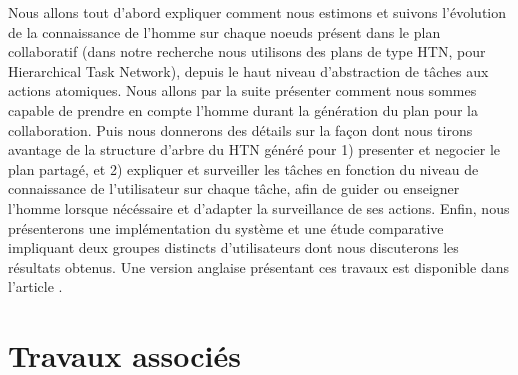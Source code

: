 \documentclass[a4paper,11pt,twoside]{StyleThese}
\begin{document}
Nous allons tout d'abord expliquer comment nous estimons et suivons l'évolution de la connaissance de l'homme sur chaque noeuds présent dans le plan collaboratif (dans notre recherche nous utilisons des plans de type HTN, pour Hierarchical Task Network), depuis le haut niveau d'abstraction de tâches aux actions atomiques. Nous allons par la suite présenter comment nous sommes capable de prendre en compte l'homme durant la génération du plan pour la collaboration. Puis nous donnerons des détails sur la façon dont nous tirons avantage de la structure d'arbre du HTN généré pour 1) presenter et negocier le plan partagé,
et 2) expliquer et surveiller les tâches en fonction du niveau de connaissance de l'utilisateur sur chaque tâche, afin de guider ou enseigner l'homme lorsque nécéssaire et d'adapter la surveillance de ses actions. Enfin, nous présenterons une implémentation du système et une étude comparative impliquant deux groupes distincts d'utilisateurs dont nous discuterons les résultats obtenus.
Une version anglaise présentant ces travaux est disponible dans l'article \cite{Milliez16}.




\section{Travaux associés}



\end{document}
